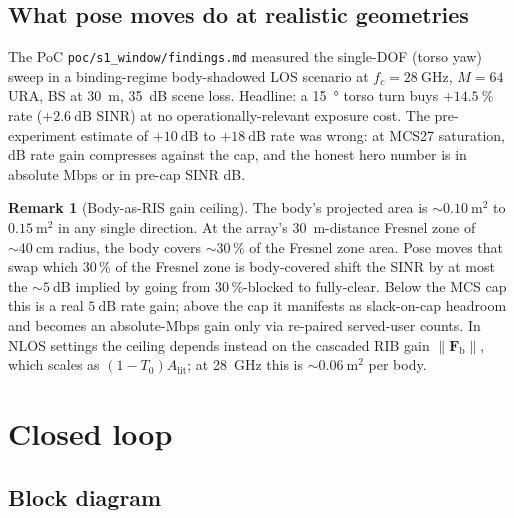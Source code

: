\documentclass[11pt,a4paper]{article}
\theoremstyle{definition}
\newtheorem{remark}[remark]{Remark}
\newcommand{\Frib}{\mathbf{F}_{\mathrm{b}}}
\begin{document}
\subsection{What pose moves do at realistic geometries}

The PoC \texttt{poc/s1\_window/findings.md} measured the
single-DOF (torso yaw) sweep in a binding-regime body-shadowed LOS
scenario at $f_c=\SI{28}{\GHz}$, $M=64$ URA, BS at \SI{30}{\m},
\SI{35}{\dB} scene loss.  Headline: a \SI{15}{\degree} torso turn
buys $+\SI{14.5}{\percent}$ rate ($+\SI{2.6}{\dB}$ SINR) at no
operationally-relevant exposure cost.  The pre-experiment estimate
of $+\SI{10}{\dB}$ to $+\SI{18}{\dB}$ rate was wrong: at MCS27
saturation, dB rate gain compresses against the cap, and the
honest hero number is in absolute Mbps or in pre-cap SINR dB.

\begin{remark}[Body-as-RIS gain ceiling]\label{rem:ceiling}
The body's projected area is $\sim\SI{0.10}{\m^2}$ to
$\SI{0.15}{\m^2}$ in any single direction.  At the array's
\SI{30}{\m}-distance Fresnel zone of $\sim\SI{40}{\cm}$ radius, the
body covers $\sim 30\,\%$ of the Fresnel zone area.  Pose moves
that swap which $30\,\%$ of the Fresnel zone is body-covered shift
the SINR by at most the $\sim\SI{5}{\dB}$ implied by going from
$30\,\%$-blocked to fully-clear.  Below the MCS cap this is a
real $\SI{5}{\dB}$ rate gain; above the cap it manifests as
slack-on-cap headroom and becomes an absolute-Mbps gain only via
re-paired served-user counts.  In NLOS settings the ceiling
depends instead on the cascaded RIB gain $\|\Frib\|$, which scales
as $(1-T_0)A_{\mathrm{lit}}$; at \SI{28}{\GHz} this is
$\sim\SI{0.06}{\m^2}$ per body.
\end{remark}

\section{Closed loop}\label{sec:loop}

\subsection{Block diagram}
\end{document}
